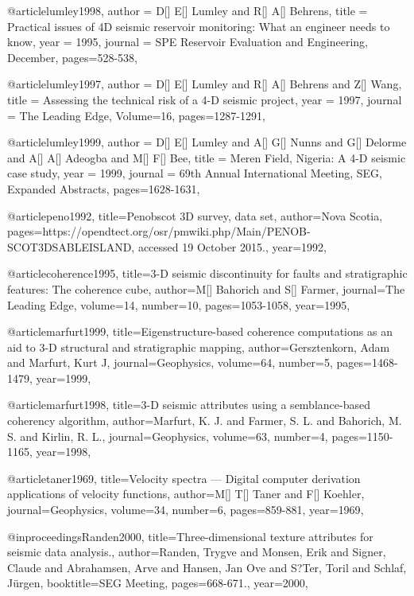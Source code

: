 @article{lumley1998,
  author =	 {D[] E[] Lumley and R[] A[] Behrens},
  title =	 { Practical issues of 4D seismic reservoir monitoring: What an engineer needs to know},
  year =	 1995,
  journal =	 {SPE Reservoir Evaluation and Engineering, December},
 pages=528-538,
}

@article{lumley1997,
  author =	 {D[] E[] Lumley and R[] A[] Behrens and Z[] Wang},
  title =	 {Assessing the technical risk of a 4-D seismic project},
  year =	 1997,
  journal =	 {The Leading Edge},
    Volume=16,
 pages=1287-1291,
}

@article{lumley1999,
  author =	 {D[] E[] Lumley and A[] G[] Nunns and G[] Delorme and A[] A[] Adeogba and M[] F[] Bee},
  title =	 {Meren Field, Nigeria: A 4-D seismic case study},
  year =	 1999,
  journal =	 {69th Annual International Meeting, SEG, Expanded Abstracts},
 pages=1628-1631,
}


@article{peno1992,
  title={Penobscot 3D survey, data set},
  author={Nova Scotia},
  pages={https://opendtect.org/osr/pmwiki.php/Main/PENOB- SCOT3DSABLEISLAND, accessed 19 October 2015.},
  year={1992},
}

@article{coherence1995,
  title={3-D seismic discontinuity for faults and stratigraphic features: The coherence cube},
  author={M[] Bahorich and S[] Farmer},
  journal={The Leading Edge},
  volume={14},
  number={10},
  pages={1053-1058},
  year={1995},
}

@article{marfurt1999,
  title={Eigenstructure-based coherence computations as an aid to 3-D structural and stratigraphic mapping},
  author={Gersztenkorn, Adam and Marfurt, Kurt J},
  journal={Geophysics},
  volume={64},
  number={5},
  pages={1468-1479},
  year={1999},
}

@article{marfurt1998,
  title={3-D seismic attributes using a semblance-based coherency algorithm},
  author={Marfurt, K. J. and Farmer, S. L. and Bahorich, M. S. and Kirlin, R. L.},
  journal={Geophysics},
  volume={63},
  number={4},
  pages={1150-1165},
  year={1998},
}

@article{taner1969,
  title={Velocity spectra — Digital computer derivation applications of velocity functions},
  author={M[] T[] Taner and F[] Koehler},
  journal={Geophysics},
  volume={34},
  number={6},
  pages={859-881},
  year={1969},
}

@inproceedings{Randen2000,
  title={Three-dimensional texture attributes for seismic data analysis.},
  author={Randen, Trygve and Monsen, Erik and Signer, Claude and Abrahamsen, Arve and Hansen, Jan Ove and S?Ter, Toril and Schlaf, Jürgen},
  booktitle={SEG Meeting},
  pages={668-671.},
  year={2000},
}








